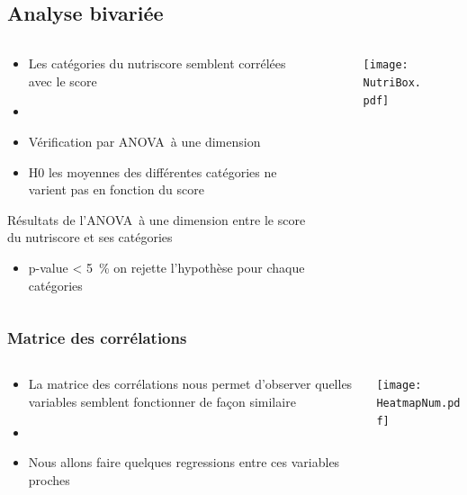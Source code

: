 \subsection{Analyse bivariée}
\begin{frame}{\insertsubsection}
  \begin{columns}
    \begin{column}{.55\textwidth}
      \begin{itemize}
        \item Les catégories du nutriscore semblent corrélées avec le score
        \item[]
        \item Vérification par ANOVA à une dimension
        \item H0 les moyennes des différentes catégories ne varient pas en fonction du score
      \end{itemize}
      \begin{table}
        \tiny
        
        \caption{Résultats de l'ANOVA à une dimension entre le score du nutriscore et ses catégories}
      \end{table}
      \begin{itemize}
        \item p-value \qty{< 5}{\percent} on rejette l'hypothèse pour chaque catégories
      \end{itemize}
    \end{column}
    \begin{column}{.45\textwidth}
      \begin{figure}
        \texttt{[image: NutriBox.pdf]}
      \end{figure}
    \end{column}
  \end{columns}
\end{frame}

\subsubsection{Matrice des corrélations}
\begin{frame}{\insertsubsubsection}
  \begin{columns}
    \begin{column}{.5\textwidth}
      \begin{itemize}
        \item La matrice des corrélations nous permet d'observer quelles variables
              semblent fonctionner de façon similaire
        \item[]
        \item Nous allons faire quelques regressions entre ces variables proches
      \end{itemize}
    \end{column}
    \begin{column}{.5\textwidth}
      \texttt{[image: HeatmapNum.pdf]}
    \end{column}
  \end{columns}
\end{frame}

